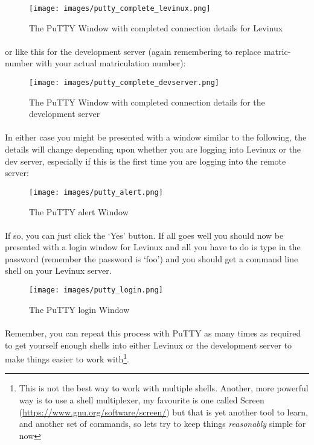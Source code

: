 \documentclass[12pt, a4paper, twoside]{book}
\begin{document}
\begin{figure}[H]
\centering
\texttt{[image: images/putty\_complete\_levinux.png]}
\caption{The PuTTY Window with completed connection details for Levinux}
\label{fig:putty-complete}
\end{figure}

\paragraph{} or like this for the development server (again remembering to replace matric-number with your actual matriculation number):

\begin{figure}[H]
\centering
\texttt{[image: images/putty\_complete\_devserver.png]}
\caption{The PuTTY Window with completed connection details for the development server}
\label{fig:putty-complete}
\end{figure}


\paragraph{} In either case you might be presented with a window similar to the following, the details will change depending upon whether you are logging into Levinux or the dev server, especially if this is the first time you are logging into the remote server:

\begin{figure}[H]
\centering
\texttt{[image: images/putty\_alert.png]}
\caption{The PuTTY alert Window}
\label{fig:putty-alert}
\end{figure}

\paragraph{} If so, you can just click the `Yes' button. If all goes well you should now be presented with a login window for Levinux and all you have to do is type in the password (remember the password is `foo') and you should get a command line shell on your Levinux server.

\begin{figure}[H]
\centering
\texttt{[image: images/putty\_login.png]}
\caption{The PuTTY login Window}
\label{fig:putty-login}
\end{figure}

\paragraph{} Remember, you can repeat this process with PuTTY as many times as required to get yourself enough shells into either Levinux or the development server to make things easier to work with\footnote{This is not the best way to work with multiple shells. Another, more powerful way is to use a shell multiplexer, my favourite is one called Screen (\url{https://www.gnu.org/software/screen/}) but that is yet another tool to learn, and another set of commands, so lets try to keep things \emph{reasonably} simple for now}.
\end{document}
